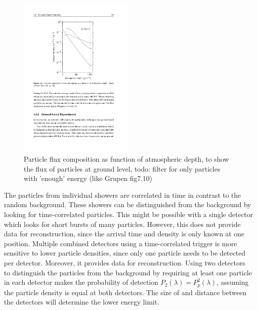 \begin{figure}
    \centering
    \includegraphics[width=0.5\textwidth]
                    {plots/cosmic-rays/particle_density}
    \caption{Particle flux composition as function of atmospheric depth, to show the flux of particles at ground level, todo: filter for only particles with 'enough' energy (like Grupen fig7.10)}
    \label{fig:particle_density}
\end{figure}

The particles from individual showers are correlated in time in contrast to the random background. These showers can be distinguished from the background by looking for time-correlated particles. This might be possible with a single detector which looks for short bursts of many particles. However, this does not provide data for reconstruction, since the arrival time and density is only known at one position. Multiple combined detectors using a time-correlated trigger is more sensitive to lower particle densities, since only one particle needs to be detected per detector. Moreover, it provides data for reconstruction. Using two detectors to distinguish the particles from the background by requiring at least one particle in each detector makes the probability of detection $P_2(\lambda) = P_p^2(\lambda)$, assuming the particle density is equal at both detectors. The size of and distance between the detectors will determine the lower energy limit.

